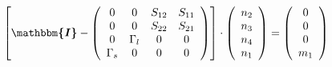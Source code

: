 \[ \left[ \boldsymbol{\mathbbm{I}}  - \left(\begin{array}{cccc} 0 & 0
& S_{12} & S_{11} \\ 0 & 0 & S_{22} & S_{21} \\ 0 & \Gamma_{l} & 0 & 0
\\ \Gamma_{s} & 0 & 0 & 0 \end{array}\right)\right] \cdot
\left(\begin{array}{c} n_{2} \\ n_{3} \\ n_{4} \\ n_{1}
\end{array}\right) = \left(\begin{array}{c} 0 \\ 0 \\ 0 \\ m_{1}
\end{array}\right) \]
